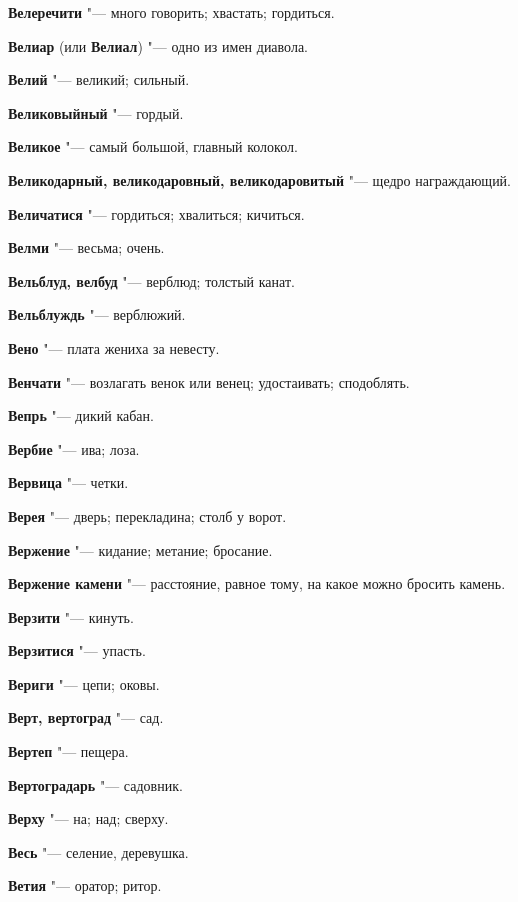 \begin{mymulticols}
\noindent\textbf{Велеречити} "--- много говорить; хвастать; гордиться. 

\noindent\textbf{Велиар} (или \textbf{Велиал}) "--- одно из имен диавола. 

\noindent\textbf{Велий} "--- великий; сильный. 

\noindent\textbf{Великовыйный} "--- гордый. 

\noindent\textbf{Великое} "--- самый большой, главный колокол. 

\noindent\textbf{Великодарный, великодаровный, великодаровитый} "--- щедро награждающий. 

\noindent\textbf{Величатися} "--- гордиться; хвалиться; кичиться. 

\noindent\textbf{Велми} "--- весьма; очень. 

\noindent\textbf{Вельблуд, велбуд} "--- верблюд; толстый канат. 

\noindent\textbf{Вельблуждь} "--- верблюжий. 

\noindent\textbf{Вено} "--- плата жениха за невесту. 

\noindent\textbf{Венчати} "--- возлагать венок или венец; удостаивать; сподоблять. 

\noindent\textbf{Вепрь} "--- дикий кабан. 

\noindent\textbf{Вербие} "--- ива; лоза. 

\noindent\textbf{Вервица} "--- четки. 

\noindent\textbf{Верея} "--- дверь; перекладина; столб у ворот. 

\noindent\textbf{Вержение} "--- кидание; метание; бросание. 

\noindent\textbf{Вержение камени} "--- расстояние, равное тому, на какое можно бросить камень. 

\noindent\textbf{Верзити} "--- кинуть. 

\noindent\textbf{Верзитися} "--- упасть. 

\noindent\textbf{Вериги} "--- цепи; оковы. 

\noindent\textbf{Верт, вертоград} "--- сад. 

\noindent\textbf{Вертеп} "--- пещера. 

\noindent\textbf{Вертоградарь} "--- садовник. 

\noindent\textbf{Верху} "--- на; над; сверху. 

\noindent\textbf{Весь} "--- селение, деревушка. 

\noindent\textbf{Ветия} "--- оратор; ритор. 


\end{mymulticols}
